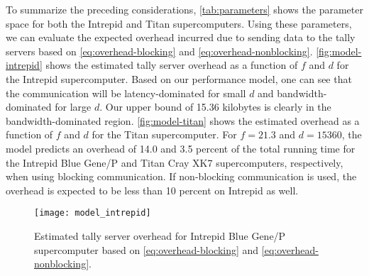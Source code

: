 \documentclass[3p,fleqn]{elsarticle}
\begin{document}
To summarize the preceding considerations, \autoref{tab:parameters} shows the
parameter space for both the Intrepid and Titan supercomputers. Using these
parameters, we can evaluate the expected overhead incurred due to sending data
to the tally servers based on \eqref{eq:overhead-blocking} and
\eqref{eq:overhead-nonblocking}. \autoref{fig:model-intrepid} shows the
estimated tally server overhead as a function of $f$ and $d$ for the Intrepid
supercomputer. Based on our performance model, one can see that the
communication will be latency-dominated for small $d$ and bandwidth-dominated
for large $d$. Our upper bound of 15.36 kilobytes is clearly in the
bandwidth-dominated region. \autoref{fig:model-titan} shows the estimated
overhead as a function of $f$ and $d$ for the Titan supercomputer. For $f =
21.3$ and $d = 15360$, the model predicts an overhead of 14.0 and 3.5 percent of
the total running time for the Intrepid Blue Gene/P and Titan Cray XK7
supercomputers, respectively, when using blocking communication. If non-blocking
communication is used, the overhead is expected to be less than 10 percent on
Intrepid as well.

\begin{table}[htb]
\end{table}

\begin{figure}[htb]
  \centering
  \texttt{[image: model\_intrepid]}
  \caption{Estimated tally server overhead for Intrepid Blue Gene/P
    supercomputer based on \eqref{eq:overhead-blocking} and
    \eqref{eq:overhead-nonblocking}.}
  \label{fig:model-intrepid}
\end{figure}
\end{document}
